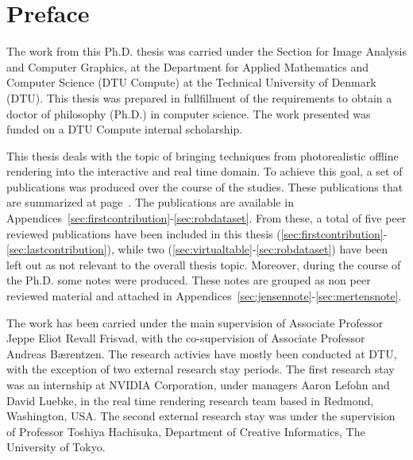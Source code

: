 \chapter{Preface}

The work from this Ph.D. thesis was carried under the Section for Image Analysis and Computer Graphics, at the Department for Applied Mathematics and Computer Science (DTU Compute) at the Technical University of Denmark (DTU). This thesis was prepared in fullfillment of the requirements to obtain a doctor of philosophy (Ph.D.) in computer science. The work presented was funded on a DTU Compute internal scholarship. 

This thesis deals with the topic of bringing techniques from photorealistic offline rendering into the interactive and real time domain. To achieve this goal, a set of publications was produced over the course of the studies. These publications that are summarized at page~\pageref{sec:contributionlist}. The publications are available in Appendices~\ref{sec:firstcontribution}-\ref{sec:robdataset}. From these, a total of five peer reviewed publications have been included in this thesis (\ref{sec:firstcontribution}-\ref{sec:lastcontribution}), while two (\ref{sec:virtualtable}-\ref{sec:robdataset}) have been left out as not relevant to the overall thesis topic. Moreover, during the course of the Ph.D. some notes were produced. These notes are grouped as non peer reviewed material and attached in Appendices~\ref{sec:jensennote}-\ref{sec:mertensnote}. 

The work has been carried under the main supervision of Associate Professor Jeppe Eliot Revall Frisvad, with the co-supervision of Associate Professor Andreas B\ae rentzen. The research activies have mostly been conducted at DTU, with the exception of two external research stay periods. The first research stay was an internship at NVIDIA Corporation, under managers Aaron Lefohn and David Luebke, in the real time rendering research team based in Redmond, Washington, USA. The second external research stay was under the supervision of Professor Toshiya Hachisuka, Department of Creative Informatics, The University of Tokyo.

